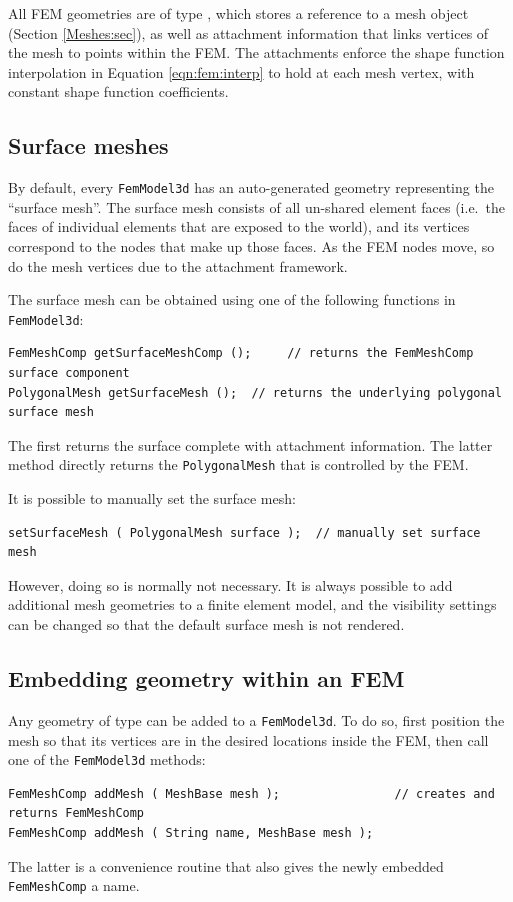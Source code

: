 All FEM geometries are of type , 
which stores a reference to a mesh object (Section \ref{Meshes:sec}), as well
as attachment information that links vertices of the mesh to points within
the FEM.  The attachments enforce the shape function interpolation in Equation
\eqref{eqn:fem:interp} to hold at each mesh vertex, with constant shape function
coefficients.

\subsection{Surface meshes}

By default, every {\tt FemModel3d} has an auto-generated geometry representing
the ``surface mesh''.  The surface mesh consists of all un-shared element faces
(i.e.~the faces of individual elements that are exposed to the world), and its
vertices correspond to the nodes that make up those faces.  As the FEM nodes
move, so do the mesh vertices due to the attachment framework.

The surface mesh can be obtained using one of the following functions in 
{\tt FemModel3d}:
\begin{lstlisting}[]
FemMeshComp getSurfaceMeshComp ();     // returns the FemMeshComp surface component
PolygonalMesh getSurfaceMesh ();  // returns the underlying polygonal surface mesh
\end{lstlisting}
The first returns the surface complete with attachment information.  The latter 
method directly returns the {\tt PolygonalMesh} that is controlled by the FEM.  

It is possible to manually set the surface mesh:
\begin{lstlisting}[]
setSurfaceMesh ( PolygonalMesh surface );  // manually set surface mesh
\end{lstlisting}
However, doing so is normally not necessary.  It is always possible to add
additional mesh geometries to a finite element model, and the visibility
settings can be changed so that the default surface mesh is not rendered.  

\subsection{Embedding geometry within an FEM}

Any geometry of type  can be added to
a {\tt FemModel3d}.  To do so, first position the mesh so that its vertices 
are in the desired locations inside the FEM, then call one of the 
{\tt FemModel3d} methods:
\begin{lstlisting}[]
FemMeshComp addMesh ( MeshBase mesh );                // creates and returns FemMeshComp
FemMeshComp addMesh ( String name, MeshBase mesh );
\end{lstlisting}
The latter is a convenience routine that also gives the newly embedded
{\tt FemMeshComp} a name.

